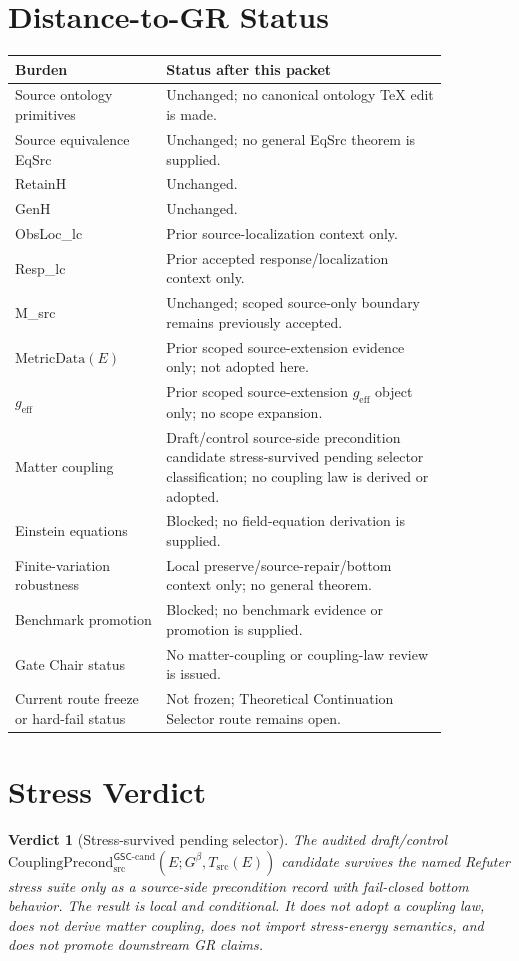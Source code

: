 \documentclass[11pt]{article}
\newcommand{\Gbeta}{G^\beta}
\newcommand{\geff}{g_{\mathrm{eff}}}
\newcommand{\CouplingPrecond}{\mathrm{CouplingPrecond}^{\mathsf{GSC}\mbox{-}\mathrm{cand}}_{\mathrm{src}}}
\newtheorem{verdict}{Verdict}
\begin{document}
\section{Distance-to-GR Status}

\begin{longtable}{p{0.30\linewidth}p{0.56\linewidth}}
\toprule
Burden & Status after this packet \\
\midrule
Source ontology primitives & Unchanged; no canonical ontology TeX edit is made. \\
Source equivalence EqSrc & Unchanged; no general EqSrc theorem is supplied. \\
RetainH & Unchanged. \\
GenH & Unchanged. \\
ObsLoc\_lc & Prior source-localization context only. \\
Resp\_lc & Prior accepted response/localization context only. \\
M\_src & Unchanged; scoped source-only boundary remains previously accepted. \\
\(\mathrm{MetricData}(E)\) & Prior scoped source-extension evidence only; not adopted here. \\
\(\geff\) & Prior scoped source-extension \(\geff\) object only; no scope expansion. \\
Matter coupling & Draft/control source-side precondition candidate stress-survived pending selector classification; no coupling law is derived or adopted. \\
Einstein equations & Blocked; no field-equation derivation is supplied. \\
Finite-variation robustness & Local preserve/source-repair/bottom context only; no general theorem. \\
Benchmark promotion & Blocked; no benchmark evidence or promotion is supplied. \\
Gate Chair status & No matter-coupling or coupling-law review is issued. \\
Current route freeze or hard-fail status & Not frozen; Theoretical Continuation Selector route remains open. \\
\bottomrule
\end{longtable}

\section{Stress Verdict}

\begin{verdict}[Stress-survived pending selector]
The audited draft/control
\(\CouplingPrecond(E;\Gbeta,T_{\mathrm{src}}(E))\) candidate survives the
named Refuter stress suite only as a source-side precondition record with
fail-closed bottom behavior. The result is local and conditional. It does not
adopt a coupling law, does not derive matter coupling, does not import
stress-energy semantics, and does not promote downstream GR claims.
\end{verdict}
\end{document}
